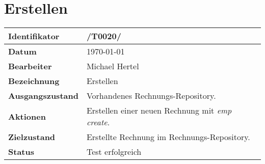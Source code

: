 
\section{Erstellen}

\renewcommand{\arraystretch}{1.5}

\begin{center}
 \begin{tabular}{|p{}|p{}|}
	\hline
	\textbf{Identifikator}  & /T0020/ \\
	\hline
	\textbf{Datum} & \today \\
	\hline
	\textbf{Bearbeiter} & Michael Hertel \\
	\hline
	\textbf{Bezeichnung} & Erstellen \\
	\hline
	\textbf{Ausgangszustand} &
		Vorhandenes Rechnungs-Repository. \\
	\hline
	\textbf{Aktionen} &
		Erstellen einer neuen Rechnung mit \textit{emp create}. \\
	\hline
	\textbf{Zielzustand} &
		Erstellte Rechnung im Rechnungs-Repository. \\
	\hline
	\textbf{Status} & Test erfolgreich \\
	\hline
 \end{tabular}
\end{center}

